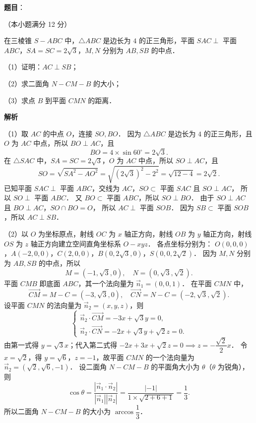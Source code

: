 \begin{answer}

\textbf{题目}：

（本小题满分 12 分）

在三棱锥 $S - ABC$ 中，$\triangle ABC$ 是边长为 $4$ 的正三角形，平面 $SAC \perp$ 平面 $ABC$，$SA = SC = 2\sqrt{3}$，$M, N$ 分别为 $AB, SB$ 的中点．

（1）证明：$AC \perp SB$；

（2）求二面角 $N - CM - B$ 的大小；

（3）求点 $B$ 到平面 $CMN$ 的距离．
\nopagebreak[4]
\begin{center}\end{center}
\nopagebreak[4]
\textbf{解析}
\nopagebreak[4]
\begin{center}\end{center}
\nopagebreak[4]
（1）取 $AC$ 的中点 $O$，连接 $SO, BO$．
因为 $\triangle ABC$ 是边长为 $4$ 的正三角形，且 $O$ 为 $AC$ 中点，所以 $BO \perp AC$，且
\nopagebreak[4]
\[
BO = 4 \times \sin 60^\circ = 2\sqrt{3}.
\]
在 $\triangle SAC$ 中，$SA = SC = 2\sqrt{3}$，$O$ 为 $AC$ 中点，所以 $SO \perp AC$，且
\nopagebreak[4]
\[
SO = \sqrt{SA^2 - AO^2} = \sqrt{(2\sqrt{3})^2 - 2^2} = \sqrt{12 - 4} = 2\sqrt{2}.
\]
已知平面 $SAC \perp$ 平面 $ABC$，交线为 $AC$，$SO \subset$ 平面 $SAC$ 且 $SO \perp AC$，
所以 $SO \perp$ 平面 $ABC$．
又 $BO \subset$ 平面 $ABC$，所以 $SO \perp BO$．
由于 $SO \perp AC$ 且 $BO \perp AC$，$SO \cap BO = O$，
所以 $AC \perp$ 平面 $SOB$．
因为 $SB \subset$ 平面 $SOB$，所以 $AC \perp SB$．

（2）以 $O$ 为坐标原点，射线 $OC$ 为 $x$ 轴正方向，射线 $OB$ 为 $y$ 轴正方向，射线 $OS$ 为 $z$ 轴正方向建立空间直角坐标系 $O-xyz$．
各点坐标分别为：
$O(0, 0, 0)$，$A(-2, 0, 0)$，$C(2, 0, 0)$，$B(0, 2\sqrt{3}, 0)$，$S(0, 0, 2\sqrt{2})$．
因为 $M, N$ 分别为 $AB, SB$ 的中点，所以
\nopagebreak[4]
\[
M = \left(-1, \sqrt{3}, 0\right), \quad N = \left(0, \sqrt{3}, \sqrt{2}\right).
\]
平面 $CMB$ 即底面 $ABC$，其一个法向量为 $\vec{n}_1 = (0, 0, 1)$．
在平面 $CMN$ 中，
\nopagebreak[4]
\[
\vec{CM} = M - C = (-3, \sqrt{3}, 0), \quad \vec{CN} = N - C = (-2, \sqrt{3}, \sqrt{2}).
\]
设平面 $CMN$ 的法向量为 $\vec{n}_2 = (x, y, z)$，则
\nopagebreak[4]
\[
\begin{cases}
\vec{n}_2 \cdot \vec{CM} = -3x + \sqrt{3}y = 0, \\
\vec{n}_2 \cdot \vec{CN} = -2x + \sqrt{3}y + \sqrt{2}z = 0.
\end{cases}
\]
由第一式得 $y = \sqrt{3}x$；代入第二式得 $-2x + 3x + \sqrt{2}z = 0 \implies z = -\dfrac{\sqrt{2}}{2}x$．
令 $x = \sqrt{2}$，得 $y = \sqrt{6}$，$z = -1$，故平面 $CMN$ 的一个法向量为 $\vec{n}_2 = (\sqrt{2}, \sqrt{6}, -1)$．
设二面角 $N - CM - B$ 的平面角大小为 $\theta$（$\theta$ 为锐角），则
\nopagebreak[4]
\[
\cos\theta = \frac{|\vec{n}_1 \cdot \vec{n}_2|}{|\vec{n}_1| |\vec{n}_2|} = \frac{| -1 |}{1 \times \sqrt{2 + 6 + 1}} = \frac{1}{3}.
\]
所以二面角 $N - CM - B$ 的大小为 $\arccos\dfrac{1}{3}$．


\end{answer}
